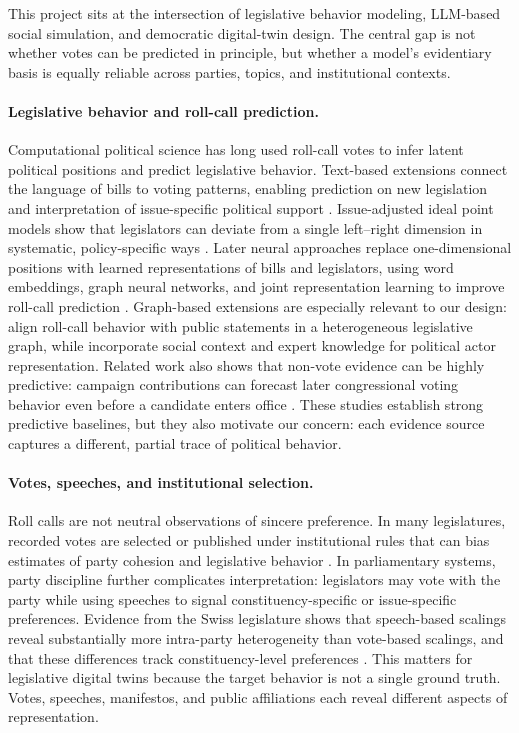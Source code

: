 \documentclass[letterpaper]{article}
\begin{document}
This project sits at the intersection of legislative behavior modeling, LLM-based social simulation, and democratic digital-twin design. The central gap is not whether votes can be predicted in principle, but whether a model's evidentiary basis is equally reliable across parties, topics, and institutional contexts.

\paragraph{Legislative behavior and roll-call prediction.}
Computational political science has long used roll-call votes to infer latent political positions and predict legislative behavior. Text-based extensions connect the language of bills to voting patterns, enabling prediction on new legislation and interpretation of issue-specific political support \citep{gerrish2011predictingRollCalls}. Issue-adjusted ideal point models show that legislators can deviate from a single left--right dimension in systematic, policy-specific ways \citep{gerrish2012howTheyVote}. Later neural approaches replace one-dimensional positions with learned representations of bills and legislators, using word embeddings, graph neural networks, and joint representation learning to improve roll-call prediction \citep{kraft2016embeddingRollCall,yang2020jointRepresentation}. Graph-based extensions are especially relevant to our design: \citet{mou2021alignVotingStatements} align roll-call behavior with public statements in a heterogeneous legislative graph, while \citet{feng2022parPoliticalActorRepresentation} incorporate social context and expert knowledge for political actor representation. Related work also shows that non-vote evidence can be highly predictive: campaign contributions can forecast later congressional voting behavior even before a candidate enters office \citep{bonica2016inferringRollCallScores}. These studies establish strong predictive baselines, but they also motivate our concern: each evidence source captures a different, partial trace of political behavior.

\paragraph{Votes, speeches, and institutional selection.}
Roll calls are not neutral observations of sincere preference. In many legislatures, recorded votes are selected or published under institutional rules that can bias estimates of party cohesion and legislative behavior \citep{hug2010selectionEffects}. In parliamentary systems, party discipline further complicates interpretation: legislators may vote with the party while using speeches to signal constituency-specific or issue-specific preferences. Evidence from the Swiss legislature shows that speech-based scalings reveal substantially more intra-party heterogeneity than vote-based scalings, and that these differences track constituency-level preferences \citep{schwarz2017estimatingIntraParty}. This matters for legislative digital twins because the target behavior is not a single ground truth. Votes, speeches, manifestos, and public affiliations each reveal different aspects of representation.
\end{document}
